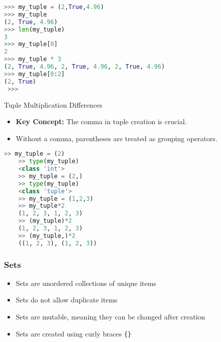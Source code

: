 \begin{frame}[fragile]
    \begin{lstlisting}[style=colorful, language=Python]
>>> my_tuple = (2,True,4.96)
>>> my_tuple
(2, True, 4.96)
>>> len(my_tuple)
3
>>> my_tuple[0]
2
>>> my_tuple * 3
(2, True, 4.96, 2, True, 4.96, 2, True, 4.96)
>>> my_tuple[0:2]
(2, True)
 >>>  
    \end{lstlisting}
\end{frame}
\begin{frame}[fragile]{Tuple Multiplication Differences}
    \begin{itemize}
      \item \textbf{Key Concept:} The comma in tuple creation is crucial.
      \item Without a comma, parentheses are treated as grouping operators.
    \end{itemize}
    \begin{lstlisting}[style=colorful, language=Python]
    >> my_tuple = (2)
    >> type(my_tuple)
    <class 'int'>
    >> my_tuple = (2,)
    >> type(my_tuple)
    <class 'tuple'>
    >> my_tuple = (1,2,3)
    >> my_tuple*2
    (1, 2, 3, 1, 2, 3)
    >> (my_tuple)*2
    (1, 2, 3, 1, 2, 3)
    >> (my_tuple,)*2
    ((1, 2, 3), (1, 2, 3))
    \end{lstlisting}
\end{frame}

\begin{frame}
    \frametitle{Sets}
    \begin{itemize}
        \item Sets are unordered collections of unique items
        \item Sets do not allow duplicate items
        \item Sets are mutable, meaning they can be changed after creation
        \item Sets are created using curly braces \texttt{\{\}}
    \end{itemize}   
\end{frame}

